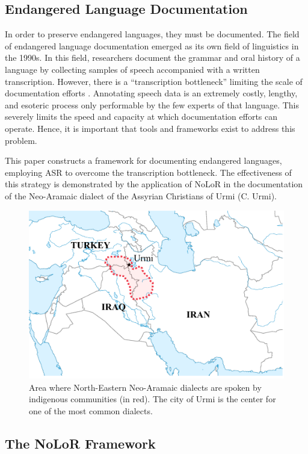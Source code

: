 \documentclass[letterpaper]{article} %
\begin{document}
\subsection{Endangered Language Documentation}

In order to preserve endangered languages, they must be documented. The field of endangered language documentation emerged as its own field of linguistics in the 1990s. In this field, researchers document the grammar and oral history of a language by collecting samples of speech accompanied with a written transcription. However, there is a ``transcription bottleneck'' limiting the scale of documentation efforts \cite{jiatong}. Annotating speech data is an extremely costly, lengthy, and esoteric process only performable by the few experts of that language. This severely limits the speed and capacity at which documentation efforts can operate. Hence, it is important that tools and frameworks exist to address this problem.

This paper constructs a framework for documenting endangered languages, employing ASR to overcome the transcription bottleneck. The effectiveness of this strategy is demonstrated by the application of NoLoR in the documentation of the Neo-Aramaic dialect of the Assyrian Christians of Urmi (C. Urmi).

\begin{figure}[t]
\centering
\includegraphics[width=\columnwidth]{map.pdf}
\caption{Area where North-Eastern Neo-Aramaic dialects are spoken by indigenous communities (in red). The city of Urmi is the center for one of the most common dialects.}
\label{fig:map}
\end{figure}

\subsection{The NoLoR Framework}
\end{document}
